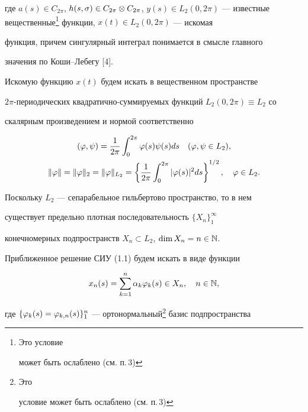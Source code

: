 где $a(s)\in C_{2\pi}$, $h(s,\si)\in C_{2\pi}\otimes C_{2\pi}$, $y(s)\in


L_2(0,2\pi)$ --- известные вещественные\footnote{Это условие


может быть ослаблено (см. п.\,3)} функции, $x(t)\in L_2(0,2\pi)$ --- искомая


функция, причем сингулярный    интеграл понимается в смысле главного


значения по Коши--Лебегу [4].


\addtocounter{footnote}{-1}





Искомую функцию $x(t)$ будем искать в вещественном пространстве


$2\pi$-периодических квад\-ра\-тич\-но-суммируемых функций $L_2(0,2\pi)\equiv L_2$ со


скалярным произведением и нормой соответственно


\begin{gather*}


(\vp,\psi)=\frac{1}{2\pi}\int_{0}^{2\pi}\vp(s)\psi(s)ds\quad


(\vp,\psi\in L_2),\\


%


\|\vp\|=\|\vp\|_{2} = \|\vp\|_{L_2} = \left\{


\frac{1}{2\pi}\int_{0}^{2\pi}|\vp(s)|^2ds


\right\}^{1/2},\quad \varphi\in L_2.


\end{gather*}





Поскольку $L_2$ --- сепарабельное гильбертово пространство, то в нем


существует предельно плотная последовательность $\{X_n\}_1^\infty$


конечномерных подпространств $X_n\subset L_2$, $\dim X_n = n\in \Bbb N$.





Приближенное решение СИУ (1.1) будем искать в виде функции


\begin{equation}


x_n(s) = \suml_{k=1}^n \alpha_k \vp_k(s)\in X_n,\quad n\in \N,


\end{equation}


где $\{\varphi_k(s) = \varphi_{k,n}(s)\}_1^n$ --- ортонормальный\footnote{Это


условие может быть ослаблено (см. п.\,3)} базис подпространства


